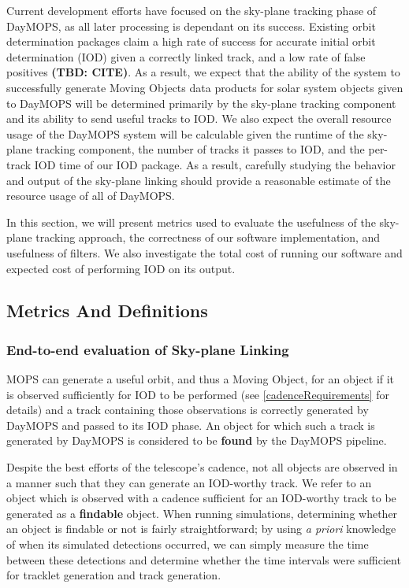 \documentclass[12pt,preprint]{aastex}
\begin{document}
Current development efforts have focused on the sky-plane tracking
phase of DayMOPS, as all later processing is dependant on its
success. Existing orbit determination packages claim a high rate of
success for accurate initial orbit determination (IOD) given a
correctly linked track, and a low rate of false positives
\textbf{(TBD: CITE)}. As a result, we expect that the ability of the
system to successfully generate Moving Objects data products for solar
system objects given to DayMOPS will be determined primarily by the
sky-plane tracking component and its ability to send useful tracks to
IOD.  We also expect the overall resource usage of the DayMOPS system
will be calculable given the runtime of the sky-plane tracking
component, the number of tracks it passes to IOD, and the per-track
IOD time of our IOD package.  As a result, carefully studying the
behavior and output of the sky-plane linking should provide a
reasonable estimate of the resource usage of all of DayMOPS.


In this section, we will present metrics used to evaluate the
usefulness of the sky-plane tracking approach, the correctness of our
software implementation, and usefulness of filters. We also
investigate the total cost of running our software and expected cost
of performing IOD on its output.



\subsection{Metrics And Definitions}

\subsubsection{End-to-end evaluation of Sky-plane Linking}
MOPS can generate a useful orbit, and thus a Moving Object, for an
object if it is observed sufficiently for IOD to be performed (see
\ref{cadenceRequirements} for details) and a track containing those
observations is correctly generated by DayMOPS and passed to its IOD
phase.  An object for which such a track is generated by DayMOPS is
considered to be \textbf{found} by the DayMOPS pipeline.  

Despite the best efforts of the telescope's cadence, not all objects
are observed in a manner such that they can generate an IOD-worthy
track.  We refer to an object which is observed with a cadence
sufficient for an IOD-worthy track to be generated as a
\textbf{findable} object.  When running simulations, determining
whether an object is findable or not is fairly straightforward; by
using \textit{a priori} knowledge of when its simulated detections
occurred, we can simply measure the time between these detections and
determine whether the time intervals were sufficient for tracklet
generation and track generation.  
\end{document}
